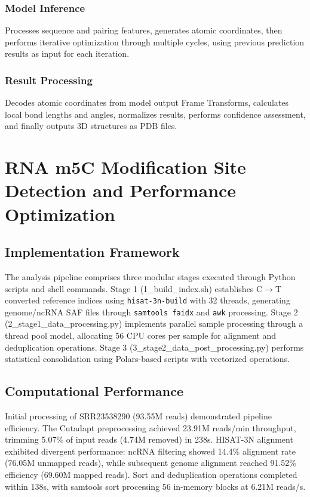 \documentclass[a4paper,12pt]{article}
\begin{document}
\subsubsection{Model Inference}
Processes sequence and pairing features, generates atomic coordinates, then performs iterative optimization through multiple cycles, using previous prediction results as input for each iteration.

\subsubsection{Result Processing}
Decodes atomic coordinates from model output Frame Transforms, calculates local bond lengths and angles, normalizes results, performs confidence assessment, and finally outputs 3D structures as PDB files.

\newpage

\section{RNA m5C Modification Site Detection and Performance Optimization}

\subsection{Implementation Framework}
The analysis pipeline comprises three modular stages executed through Python scripts and shell commands. Stage 1 (1\_build\_index.sh) establishes C$\rightarrow$T converted reference indices using \texttt{hisat-3n-build} with 32 threads, generating genome/ncRNA SAF files through \texttt{samtools faidx} and \texttt{awk} processing. Stage 2 (2\_stage1\_data\_processing.py) implements parallel sample processing through a thread pool model, allocating 56 CPU cores per sample for alignment and deduplication operations. Stage 3 (3\_stage2\_data\_post\_processing.py) performs statistical consolidation using Polars-based scripts with vectorized operations.

\subsection{Computational Performance}
Initial processing of SRR23538290 (93.55M reads) demonstrated pipeline efficiency. The Cutadapt preprocessing achieved 23.91M reads/min throughput, trimming 5.07\% of input reads (4.74M removed) in 238s. HISAT-3N alignment exhibited divergent performance: ncRNA filtering showed 14.4\% alignment rate (76.05M unmapped reads), while subsequent genome alignment reached 91.52\% efficiency (69.60M mapped reads). Sort and deduplication operations completed within 138s, with samtools sort processing 56 in-memory blocks at 6.21M reads/s.
\end{document}
